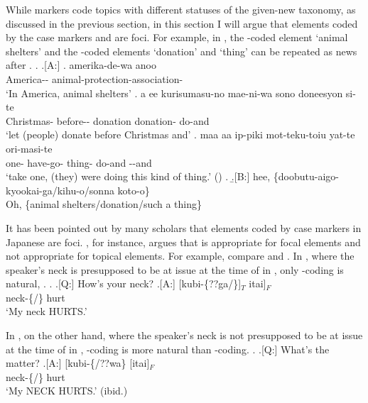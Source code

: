 While  markers code topics with different statuses of the given-new taxonomy, as discussed in the previous section,
in this section I will argue that
elements coded by the case markers  and  are foci.
For example, in \Next,
the -coded element  `animal shelters' and
the -coded elements  `donation' and  `thing'
can be repeated as news after .
%
\ex.
 \a.[A:]
 \ag. amerika-de-wa anoo  \\
   America--  animal-protection-association- \\
   `In America, animal shelters'
  \bg. a ee kurisumasu-no mae-ni-wa sono doneesyon  si-te \\
     Christmas- before--  donation donation- do-and \\
   `let (people) donate before Christmas and'
  \bg. maa aa ip-piki mot-teku-toiu  yat-te ori-masi-te \\
     one- have-go- thing- do-and --and \\
   `take one, (they) were doing this kind of thing.'
   \hfill{()}
  \z.
  \b.[B:] hee, \{doobutu-aigo-kyookai-ga/kihu-o/sonna koto-o\} \\
   Oh, \{animal shelters/donation/such a thing\}
%

It has been pointed out by many scholars that
elements coded by case markers in Japanese are foci.
, for instance, argues that  is appropriate for focal elements
and not appropriate for topical elements.
For example,
compare \Next and \NNext.
In \Next,
where the speaker's neck is presupposed to be at issue at the time of  in \Next[A],
only -coding is natural,
.
%
\ex. \a.[Q:] How's your neck?
	\bg.[A:] [kubi-\{??ga/\}]$_{T}$ itai]$_{F}$ \\
			neck-\{/\} hurt \\
			`My neck HURTS.' \hfill{}

In \Next,
on the other hand,
where the speaker's neck is not presupposed to be at issue at the time of  in \Next[A],
-coding is more natural than -coding.
\ex. \a.[Q:] What's the matter?
	\bg.[A:] [kubi-\{/??wa\} [itai]$_{F}$ \\
			neck-\{/\} hurt \\
			`My NECK HURTS.' \hfill{(ibid.)}


